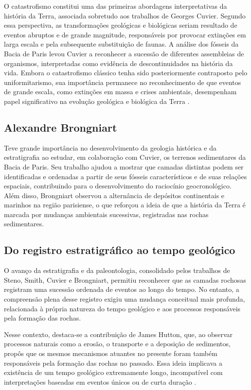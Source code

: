 O catastrofismo constitui uma das primeiras abordagens interpretativas da história da Terra, associada sobretudo aos trabalhos de Georges Cuvier. Segundo essa perspectiva, as transformações geológicas e biológicas seriam resultado de eventos abruptos e de grande magnitude, responsáveis por provocar extinções em larga escala e pela subsequente substituição de faunas. A análise dos fósseis da Bacia de Paris levou Cuvier a reconhecer a sucessão de diferentes assembleias de organismos, interpretadas como evidência de descontinuidades na história da vida. Embora o catastrofismo clássico tenha sido posteriormente contraposto pelo uniformitarismo, sua importância permanece no reconhecimento de que eventos de grande escala, como extinções em massa e crises ambientais, desempenham papel significativo na evolução geológica e biológica da Terra \parencite{rudwick1997}.

\subsection{Alexandre Brongniart} 
Teve grande importância no desenvolvimento da geologia histórica e da estratigrafia ao estudar, em colaboração com Cuvier, os terrenos sedimentares da Bacia de Paris. Seu trabalho ajudou a mostrar que camadas distintas podem ser identificadas e ordenadas a partir de seus fósseis característicos e de suas relações espaciais, contribuindo para o desenvolvimento do raciocínio geocronológico. Além disso, Brongniart observou a alternância de depósitos continentais e marinhos na região parisiense, o que reforçou a ideia de que a história da Terra é marcada por mudanças ambientais sucessivas, registradas nas rochas sedimentares.

\subsection{Do registro estratigráfico ao tempo geológico}

O avanço da estratigrafia e da paleontologia, consolidado pelos trabalhos de Steno, Smith, Cuvier e Brongniart, permitiu reconhecer que as camadas rochosas registram uma sucessão ordenada de eventos ao longo do tempo. No entanto, a compreensão plena desse registro exigiu uma mudança conceitual mais profunda, relacionada à própria natureza do tempo geológico e aos processos responsáveis pela formação das rochas.

Nesse contexto, destaca-se a contribuição de James Hutton, que, ao observar processos naturais como a erosão, o transporte e a deposição de sedimentos, propôs que os mesmos mecanismos atuantes no presente foram também responsáveis pela formação das rochas no passado. Essa ideia implicava a existência de um tempo geológico extremamente longo, incompatível com interpretações baseadas em eventos únicos ou de curta duração \parencite{geolsoc_siccar}.


